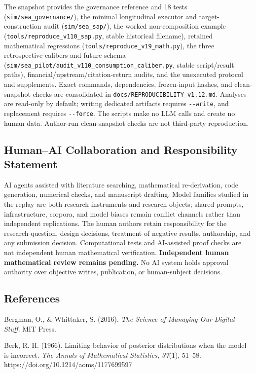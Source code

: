 \documentclass[
  11pt]{article}
\begin{document}
The snapshot provides the governance reference and 18 tests
(\texttt{sim/sea\_governance/}), the minimal longitudinal executor and
target-construction audit (\texttt{sim/sea\_sap/}), the worked
non-composition example (\texttt{tools/reproduce\_v110\_sap.py}, stable
historical filename), retained mathematical regressions
(\texttt{tools/reproduce\_v19\_math.py}), the three retrospective
calibers and future schema
(\texttt{sim/sea\_pilot/audit\_v110\_consumption\_caliber.py}, stable
script/result paths), financial/upstream/citation-return audits, and the
unexecuted protocol and supplements. Exact commands, dependencies,
frozen-input hashes, and clean-snapshot checks are consolidated in
\texttt{docs/REPRODUCIBILITY\_v1.12.md}. Analyses are read-only by
default; writing dedicated artifacts requires \texttt{-\/-write}, and
replacement requires \texttt{-\/-force}. The scripts make no LLM calls
and create no human data. Author-run clean-snapshot checks are not
third-party reproduction.

\subsection{Human--AI Collaboration and Responsibility
Statement}\label{humanai-collaboration-and-responsibility-statement}

AI agents assisted with literature searching, mathematical
re-derivation, code generation, numerical checks, and manuscript
drafting. Model families studied in the replay are both research
instruments and research objects; shared prompts, infrastructure,
corpora, and model biases remain conflict channels rather than
independent replications. The human authors retain responsibility for
the research question, design decisions, treatment of negative results,
authorship, and any submission decision. Computational tests and
AI-assisted proof checks are not independent human mathematical
verification. \textbf{Independent human mathematical review remains
pending.} No AI system holds approval authority over objective writes,
publication, or human-subject decisions.

\subsection{References}\label{references}

Bergman, O., \& Whittaker, S. (2016). \emph{The Science of Managing Our
Digital Stuff}. MIT Press.

Berk, R. H. (1966). Limiting behavior of posterior distributions when
the model is incorrect. \emph{The Annals of Mathematical Statistics,
37}(1), 51--58. https://doi.org/10.1214/aoms/1177699597
\end{document}
